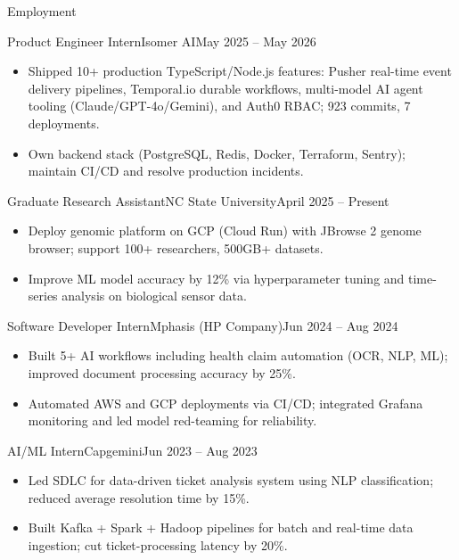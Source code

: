 \documentclass[]{mcdowellcv}
\begin{document}
\makeheader

\begin{cvsection}{Employment}
  \begin{cvsubsection}{Product Engineer Intern}{Isomer AI}{May 2025 -- May 2026}
    \begin{itemize}
      \item Shipped 10+ production TypeScript/Node.js features: Pusher real-time event delivery pipelines, Temporal.io durable workflows, multi-model AI agent tooling (Claude/GPT-4o/Gemini), and Auth0 RBAC; 923 commits, 7 deployments.
      \item Own backend stack (PostgreSQL, Redis, Docker, Terraform, Sentry); maintain CI/CD and resolve production incidents.
    \end{itemize}
    \vspace{-1.5pt}
  \end{cvsubsection}

  \begin{cvsubsection}{Graduate Research Assistant}{NC State University}{April 2025 -- Present}
    \begin{itemize}
      \item Deploy genomic platform on GCP (Cloud Run) with JBrowse 2 genome browser; support 100+ researchers, 500GB+ datasets.
      \item Improve ML model accuracy by 12\% via hyperparameter tuning and time-series analysis on biological sensor data.
    \end{itemize}
    \vspace{-1.5pt}
  \end{cvsubsection}

  \begin{cvsubsection}{Software Developer Intern}{Mphasis (HP Company)}{Jun 2024 -- Aug 2024}
    \begin{itemize}
      \item Built 5+ AI workflows including health claim automation (OCR, NLP, ML); improved document processing accuracy by 25\%.
      \item Automated AWS and GCP deployments via CI/CD; integrated Grafana monitoring and led model red-teaming for reliability.
    \end{itemize}
    \vspace{-1.5pt}
  \end{cvsubsection}

  \begin{cvsubsection}{AI/ML Intern}{Capgemini}{Jun 2023 -- Aug 2023}
    \begin{itemize}
      \item Led SDLC for data-driven ticket analysis system using NLP classification; reduced average resolution time by 15\%.
      \item Built Kafka + Spark + Hadoop pipelines for batch and real-time data ingestion; cut ticket-processing latency by 20\%.
    \end{itemize}
    \vspace{-1.5pt}
  \end{cvsubsection}
\end{cvsection}
\end{document}
